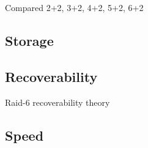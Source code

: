 Compared 2+2, 3+2, 4+2, 5+2, 6+2
\subsection{Storage}

\subsection{Recoverability}

Raid-6 recoverability theory

\subsection{Speed}